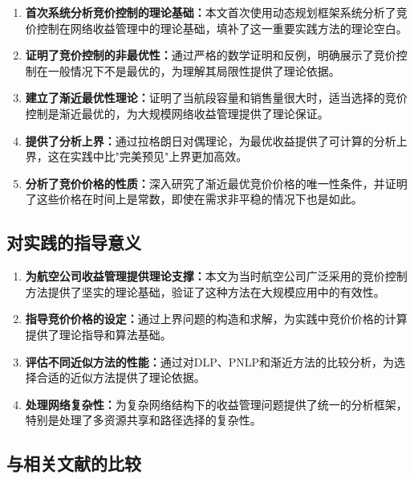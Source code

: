 \documentclass[
  10pt
]{article}
\begin{document}
\begin{enumerate}
\item \textbf{首次系统分析竞价控制的理论基础：}本文首次使用动态规划框架系统分析了竞价控制在网络收益管理中的理论基础，填补了这一重要实践方法的理论空白。

\item \textbf{证明了竞价控制的非最优性：}通过严格的数学证明和反例，明确展示了竞价控制在一般情况下不是最优的，为理解其局限性提供了理论依据。

\item \textbf{建立了渐近最优性理论：}证明了当航段容量和销售量很大时，适当选择的竞价控制是渐近最优的，为大规模网络收益管理提供了理论保证。

\item \textbf{提供了分析上界：}通过拉格朗日对偶理论，为最优收益提供了可计算的分析上界，这在实践中比"完美预见"上界更加高效。

\item \textbf{分析了竞价价格的性质：}深入研究了渐近最优竞价价格的唯一性条件，并证明了这些价格在时间上是常数，即使在需求非平稳的情况下也是如此。
\end{enumerate}

\subsection{对实践的指导意义}

\begin{enumerate}
\item \textbf{为航空公司收益管理提供理论支撑：}本文为当时航空公司广泛采用的竞价控制方法提供了坚实的理论基础，验证了这种方法在大规模应用中的有效性。

\item \textbf{指导竞价价格的设定：}通过上界问题的构造和求解，为实践中竞价价格的计算提供了理论指导和算法基础。

\item \textbf{评估不同近似方法的性能：}通过对DLP、PNLP和渐近方法的比较分析，为选择合适的近似方法提供了理论依据。

\item \textbf{处理网络复杂性：}为复杂网络结构下的收益管理问题提供了统一的分析框架，特别是处理了多资源共享和路径选择的复杂性。
\end{enumerate}

\subsection{与相关文献的比较}
\end{document}
